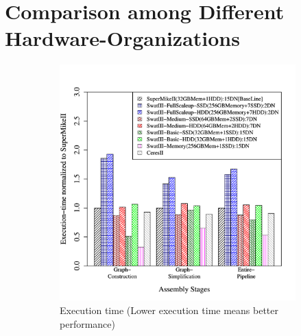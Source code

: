 \documentclass[conference]{IEEEtran}
\begin{document}
\section {Comparison among Different Hardware-Organizations} \label{ComparingDifferentArchitecturalBalance}
\begin{figure}[htb]
        \begin{subfigure}[b]{0.5\textwidth}
                \includegraphics[width=\textwidth, height=.27\textheight]{Figure/PerormanceData/Plots/PerfDiffArch.pdf}
                \caption{Execution time (Lower execution time means better performance)}
                \label{fig:DifferentArchitecturesPerf}
        \end{subfigure}
        \begin{subfigure}[b]{0.5\textwidth}

\end{subfigure}
\end{figure}
\end{document}
